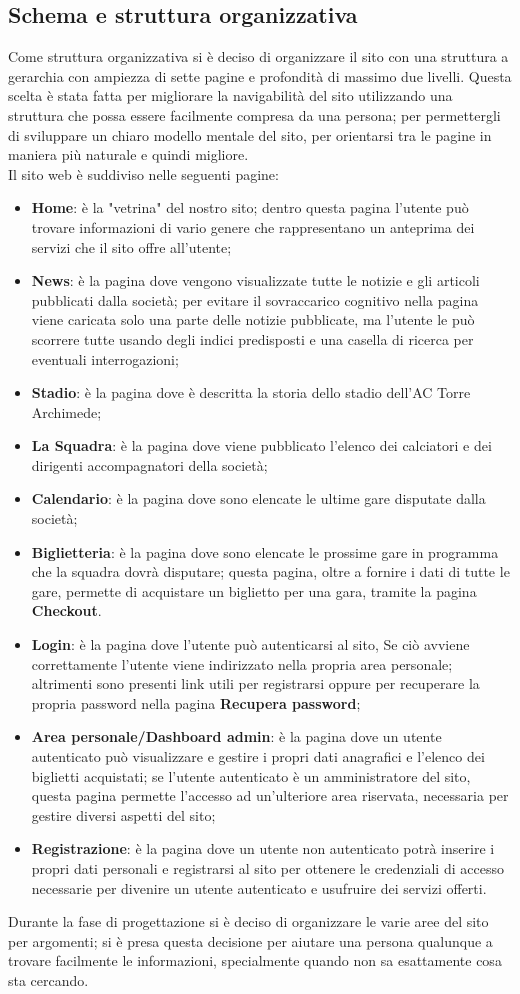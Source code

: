     \subsection{Schema e struttura organizzativa}
    Come struttura organizzativa si è deciso di organizzare il sito con una struttura a gerarchia con ampiezza di sette pagine e profondità di massimo due livelli. Questa scelta è stata fatta per migliorare la navigabilità del sito utilizzando una struttura che possa essere facilmente compresa da una persona; per permettergli di sviluppare un chiaro modello mentale del sito, per orientarsi tra le pagine in maniera più naturale e quindi migliore.\\
    Il sito web è suddiviso nelle seguenti pagine:
    \begin{itemize}
        \item \textbf{Home}: è la "vetrina" del nostro sito; dentro questa pagina l'utente può trovare informazioni di vario genere che rappresentano un anteprima dei servizi che il sito offre all'utente;
        \item \textbf{News}: è la pagina dove vengono visualizzate tutte le notizie e gli articoli pubblicati dalla società; per evitare il sovraccarico cognitivo nella pagina viene caricata solo una parte delle notizie pubblicate, ma l'utente le può scorrere tutte usando degli indici predisposti e una casella di ricerca per eventuali interrogazioni;
        \item \textbf{Stadio}: è la pagina dove è descritta la storia dello stadio dell'AC Torre Archimede;
        \item \textbf{La Squadra}: è la pagina dove viene pubblicato l'elenco dei calciatori e dei dirigenti accompagnatori della società;
        \item \textbf{Calendario}: è la pagina dove sono elencate le ultime gare disputate dalla società;
        \item \textbf{Biglietteria}: è la pagina dove sono elencate le prossime gare in programma che la squadra dovrà disputare; questa pagina, oltre a fornire i dati di tutte le gare, permette di acquistare un biglietto per una gara, tramite la pagina \textbf{Checkout}.
        \item \textbf{Login}: è la pagina dove l'utente può autenticarsi al sito, Se ciò avviene correttamente l'utente viene indirizzato nella propria area personale; altrimenti sono presenti link utili per registrarsi oppure per recuperare la propria password nella pagina \textbf{Recupera password};
        \item \textbf{Area personale/Dashboard admin}: è la pagina dove un utente autenticato può visualizzare e gestire i propri dati anagrafici e l'elenco dei biglietti acquistati; se l'utente autenticato è un amministratore del sito, questa pagina permette l'accesso ad un'ulteriore area riservata, necessaria per gestire diversi aspetti del sito;
        \item \textbf{Registrazione}: è la pagina dove un utente non autenticato potrà inserire i propri dati personali e registrarsi al sito per ottenere le credenziali di accesso necessarie per divenire un utente autenticato e usufruire dei servizi offerti.
    \end{itemize}
    \noindent
    Durante la fase di progettazione si è deciso di organizzare le varie aree del sito per argomenti; si è presa questa decisione per aiutare una persona qualunque a trovare facilmente le informazioni, specialmente quando non sa esattamente cosa sta cercando.